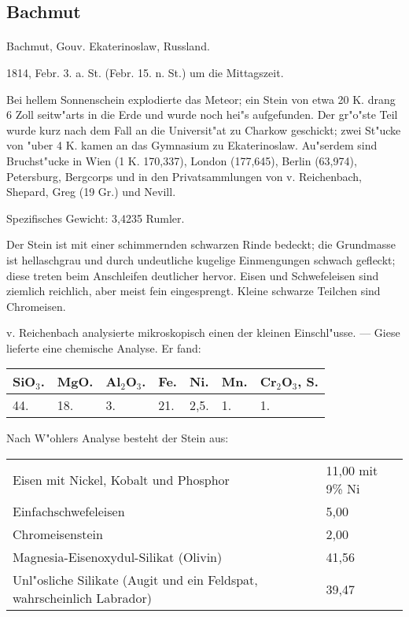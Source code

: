 \documentclass[a4paper, 11pt, oneside]{article}
\begin{document}
\subsection{Bachmut}
\normalsize
\paragraph{}
Bachmut, Gouv. Ekaterinoslaw, Russland.

1814, Febr. 3. a. St. (Febr. 15. n. St.) um die Mittagszeit.

Bei hellem Sonnenschein explodierte das Meteor; ein Stein von etwa 20 K. drang 6 Zoll seitw"arts in die Erde und wurde noch hei"s aufgefunden. Der gr"o"ste Teil wurde kurz nach dem Fall an die Universit"at zu Charkow geschickt; zwei St"ucke von "uber 4 K. kamen an das Gymnasium zu Ekaterinoslaw. Au"serdem sind Bruchst"ucke in Wien (1 K. 170,337), London (177,645), Berlin (63,974), Petersburg, Bergcorps und in den Privatsammlungen von v. Reichenbach, Shepard, Greg (19 Gr.) und Nevill.

Spezifisches Gewicht: 3,4235 Rumler.

Der Stein ist mit einer schimmernden schwarzen Rinde bedeckt; die Grundmasse ist hellaschgrau und durch undeutliche kugelige Einmengungen schwach gefleckt; diese treten beim Anschleifen deutlicher hervor. Eisen und Schwefeleisen sind ziemlich reichlich, aber meist fein eingesprengt. Kleine schwarze Teilchen sind Chromeisen.

v. Reichenbach analysierte mikroskopisch einen der kleinen Einschl"usse. --- Giese lieferte eine chemische Analyse. Er fand:
\begin{table}[!ht]
    \centering
    \begin{tabular}{l l l l l l l}
        SiO$_{3}$. & MgO. & Al$_{2}$O$_{3}$. & Fe. & Ni. & Mn. & Cr$_{2}$O$_{3}$, S. \\ \hline
        44. & 18. & 3. & 21. & 2,5. & 1. & 1. \\
    \end{tabular}
\end{table}

Nach W"ohlers Analyse besteht der Stein aus:
\begin{table}[!ht]
    \centering
    \begin{tabular}{p{75mm} l}
        Eisen mit Nickel, Kobalt und Phosphor & 11,00 mit 9\% Ni \\
        Einfachschwefeleisen & 5,00 \\
        Chromeisenstein & 2,00 \\
        Magnesia-Eisenoxydul-Silikat (Olivin) & 41,56 \\
        Unl"osliche Silikate (Augit und ein Feldspat, wahrscheinlich Labrador) & 39,47 \\
    \end{tabular}
\end{table}
\end{document}
